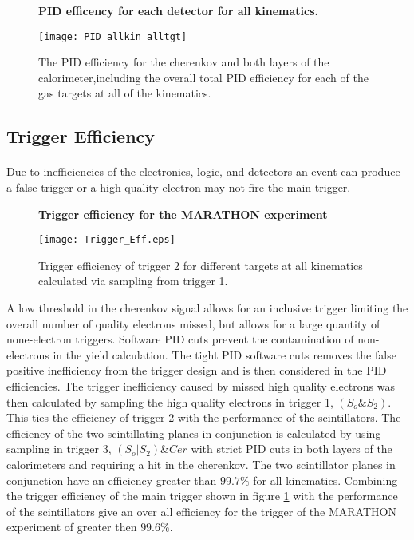 \begin{figure}[t]
	{\centering
		\textbf{PID efficency for each detector for all kinematics. }\par\medskip}
	\centering
	\texttt{[image: PID\_allkin\_alltgt]}
	\caption{The PID efficiency for the cherenkov and both layers of the calorimeter,including the overall total PID efficiency for each of the gas targets at all of the kinematics.}
\end{figure}

\subsection{Trigger Efficiency}
\paragraph{}  Due to inefficiencies of the electronics, logic, and detectors an event can produce a false trigger or a high quality electron may not fire the main trigger.
\begin{figure}[]
	\centering
	\textbf{Trigger efficiency for the MARATHON experiment }\par\medskip
	\texttt{[image: Trigger\_Eff.eps]}
	\caption{Trigger efficiency of trigger 2 for different targets at all kinematics calculated via sampling from trigger 1. }
	\label{trigeff}
\end{figure}
A low threshold in the cherenkov signal allows for an inclusive trigger limiting the overall number of quality electrons missed, but allows for a large quantity of none-electron triggers. Software PID cuts prevent the contamination of non-electrons in the yield calculation. The tight PID software cuts removes the false positive inefficiency from the trigger design and is then considered in the PID efficiencies. The trigger inefficiency caused by missed high quality electrons was then calculated by sampling the high quality electrons in trigger 1, $(S_o \& S_2)$. This ties the efficiency of trigger 2 with the performance of the scintillators. The efficiency of the two scintillating planes in conjunction is calculated by using sampling in trigger 3, $(S_o | S_2) \& Cer$ with strict PID cuts in both layers of the calorimeters and requiring a hit in the cherenkov. The two scintillator planes in conjunction have an efficiency greater than $99.7 \% $ for all kinematics. Combining the trigger efficiency of the main trigger shown in figure \ref{trigeff} with the performance of the scintillators give an over all efficiency for the trigger of the MARATHON experiment of greater then $99.6\%$.

